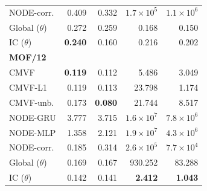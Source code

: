 \begin{tabular*}{\linewidth}{@{\extracolsep{\fill}}lrrrr}
NODE-corr. & 0.409 & 0.332 & $1.7\!\times\!10^{5}$ & $1.1\!\times\!10^{6}$ \\
Global ($\theta$) & 0.272 & 0.259 & 0.168 & 0.150 \\
IC ($\theta$) & \textbf{0.240} & 0.160 & 0.216 & 0.202 \\
\midrule
\multicolumn{5}{l}{\textbf{MOF/12}} \\
CMVF & \textbf{0.119} & 0.112 & 5.486 & 3.049 \\
CMVF-L1 & 0.119 & 0.113 & 23.798 & 1.174 \\
CMVF-unb. & 0.173 & \textbf{0.080} & 21.744 & 8.517 \\
NODE-GRU & 3.777 & 3.715 & $1.6\!\times\!10^{7}$ & $7.8\!\times\!10^{6}$ \\
NODE-MLP & 1.358 & 2.121 & $1.9\!\times\!10^{7}$ & $4.3\!\times\!10^{6}$ \\
NODE-corr. & 0.185 & 0.314 & $2.6\!\times\!10^{5}$ & $7.7\!\times\!10^{4}$ \\
Global ($\theta$) & 0.169 & 0.167 & 930.252 & 83.288 \\
IC ($\theta$) & 0.142 & 0.141 & \textbf{2.412} & \textbf{1.043} \\
\bottomrule
\end{tabular*}
